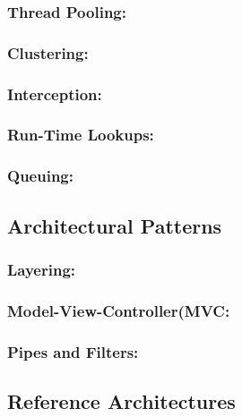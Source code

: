 \documentclass[12pt]{article}
\begin{document}
	\subsubsection {Thread Pooling:} 


	\subsubsection {Clustering:} 


	\subsubsection{Interception:}
	

	\subsubsection {Run-Time Lookups:}


	\subsubsection {Queuing:}



	\subsection{Architectural Patterns}


	\subsubsection{Layering:} 



	\subsubsection{Model-View-Controller(MVC:}



	\subsubsection{Pipes and Filters:}



	\subsection{Reference Architectures}
\end{document}
